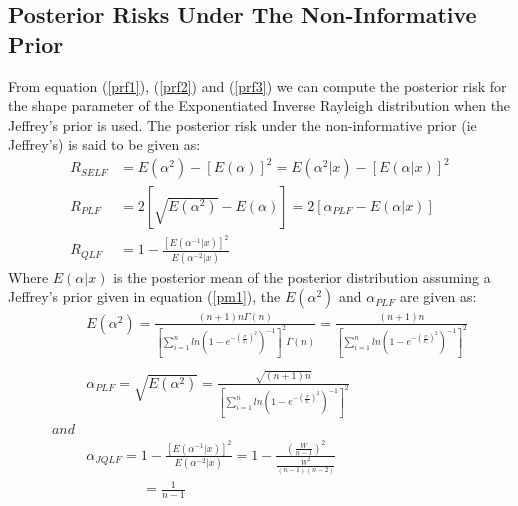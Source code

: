 \documentclass[a4paper,12pt]{report}
\newcommand{\para}{\hspace{0.5cm}}
\begin{document}
\subsection{Posterior Risks Under The Non-Informative Prior}
\noindent\para From equation (\ref{prf1}), (\ref{prf2}) and (\ref{prf3}) we can compute the posterior risk for the shape parameter of the Exponentiated Inverse Rayleigh distribution when the Jeffrey's prior is used. The posterior risk under the non-informative prior (ie Jeffrey's) is said to be given as:  
\begin{equation}\label{prj}
\begin{split}
R_{SELF}&=E(\alpha^2)-\left[E(\alpha)\right]^2=E(\alpha^2|x)-\left[E(\alpha|x)\right]^2\\
R_{PLF} &= 2\left[ {\sqrt {E\left( {{\alpha ^2}} \right)}  - E\left( \alpha  \right)} \right] = 2\left[ {{\alpha _{PLF}} - E\left( {\alpha |x} \right)} \right]\\
R_{QLF} &= 1-\frac{[E(\alpha^{-1}|x)]^2}{E(\alpha^{-2}|x)}
\end{split}
\end{equation}
\noindent Where $E(\alpha|x)$ is  the posterior mean of the posterior distribution assuming a Jeffrey's prior given in equation (\ref{pm1}), the $E(\alpha^2)$ and $\alpha_{PLF}$ are given as:
\begin{equation}\label{a}
\begin{split}
&E(\alpha^2)=\frac{(n+1)n\Gamma(n)}{\left[\sum\limits_{ i=1 }^{n}ln\left(1-e^{-\left(\frac{\sigma}{x_i}\right)^2}\right)^{-1}\right]^2\Gamma(n)}=\frac{(n+1)n}{\left[\sum\limits_{ i=1 }^{n}ln\left(1-e^{-\left(\frac{\sigma}{x_i}\right)^2}\right)^{-1}\right]^2}\\
\\
&\alpha _{PLF}=\sqrt {E\left( {{\alpha ^2}} \right)}=\frac{\sqrt{(n+1)n}}{\left[\sum\limits_{ i=1 }^{n}ln\left(1-e^{-\left(\frac{\sigma}{x_i}\right)^2}\right)^{-1}\right]^2}\\
and&\\
&\alpha_{JQLF}=1-\frac{[E(\alpha^{-1}|x)]^2}{E(\alpha^{-2}|x)}=1-\frac{\left(\frac{W}{n-1}\right)^2}{\frac{W^2}{(n-1)(n-2)}}\\
&\qquad\qquad=\frac{1}{n-1}
\end{split}
\end{equation}
\end{document}
